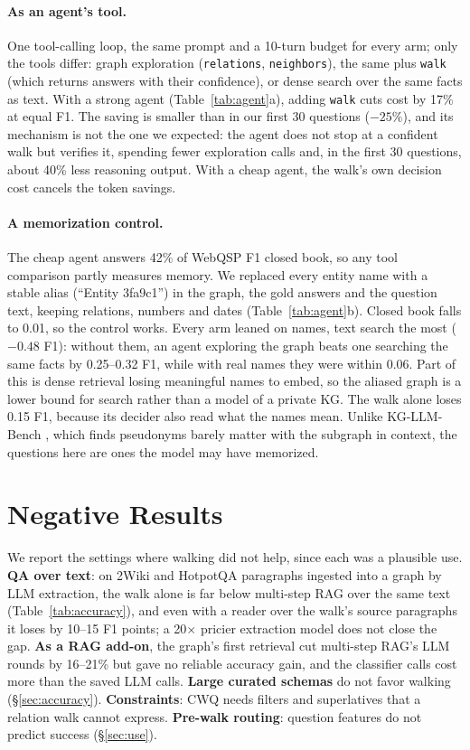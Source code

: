 \documentclass[11pt]{article}
\begin{document}
\paragraph{As an agent's tool.} One tool-calling loop, the same prompt and a 10-turn
budget for every arm; only the tools differ: graph exploration (\texttt{relations},
\texttt{neighbors}), the same plus \texttt{walk} (which returns answers with their
confidence), or dense search over the same facts as text. With a strong agent
(Table~\ref{tab:agent}a), adding \texttt{walk} cuts cost by 17\% at equal F1. The
saving is smaller than in our first 30 questions ($-25\%$), and its mechanism is not the
one we expected: the agent does not stop at a confident walk but verifies it, spending
fewer exploration calls and, in the first 30 questions, about 40\% less reasoning
output. With a cheap agent, the
walk's own decision cost cancels the token savings.

\paragraph{A memorization control.} The cheap agent answers 42\% of WebQSP F1 closed
book, so any tool comparison partly measures memory. We replaced every entity name with
a stable alias (``Entity 3fa9c1'') in the graph, the gold answers and the question text,
keeping relations, numbers and dates (Table~\ref{tab:agent}b). Closed book falls to
0.01, so the control works. Every arm leaned on names, text search the most ($-0.48$
F1): without them, an agent exploring the graph beats one searching the same facts by
0.25--0.32 F1, while with real names they were within 0.06. Part of this is dense
retrieval losing meaningful names to embed, so the aliased graph is a lower bound for
search rather than a model of a private KG. The walk alone loses 0.15 F1, because its
decider also read what the names mean. Unlike KG-LLM-Bench
\citep{markowitz2025kgllmbench}, which finds pseudonyms barely matter with the subgraph
in context, the questions here are ones the model may have memorized.

\section{Negative Results}
\label{sec:negative}

We report the settings where walking did not help, since each was a plausible use.
\textbf{QA over text}: on 2Wiki and HotpotQA paragraphs ingested into a graph by LLM
extraction, the walk alone is far below multi-step RAG over the same text
(Table~\ref{tab:accuracy}), and even with a reader over the walk's source paragraphs it
loses by 10--15 F1 points; a 20$\times$ pricier extraction model does not close the gap. \textbf{As a RAG add-on},
the graph's first retrieval cut multi-step RAG's LLM rounds by 16--21\% but gave no
reliable accuracy gain, and the classifier calls cost more than the saved LLM calls.
\textbf{Large curated schemas} do not favor walking (\S\ref{sec:accuracy}).
\textbf{Constraints}: CWQ needs filters and superlatives that a relation walk cannot
express. \textbf{Pre-walk routing}: question features do not predict success
(\S\ref{sec:use}).
\end{document}
